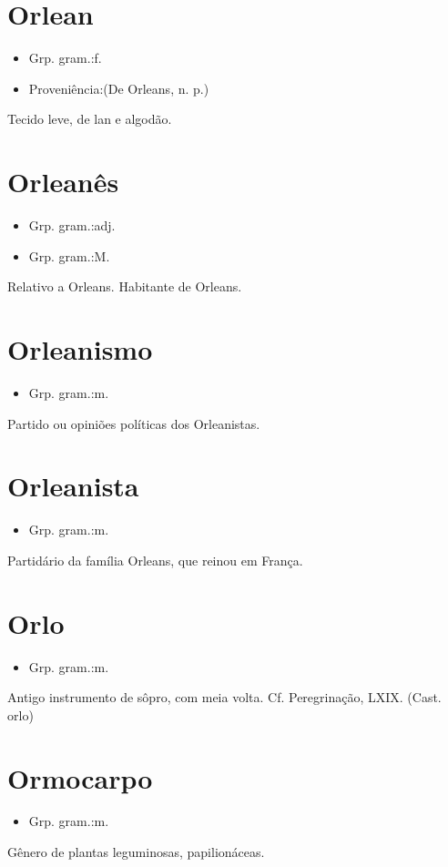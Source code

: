 \section{Orlean}
\begin{itemize}
\item {Grp. gram.:f.}
\end{itemize}
\begin{itemize}
\item {Proveniência:(De \textunderscore Orleans\textunderscore , n. p.)}
\end{itemize}
Tecido leve, de lan e algodão.
\section{Orleanês}
\begin{itemize}
\item {Grp. gram.:adj.}
\end{itemize}
\begin{itemize}
\item {Grp. gram.:M.}
\end{itemize}
Relativo a Orleans.
Habitante de Orleans.
\section{Orleanismo}
\begin{itemize}
\item {Grp. gram.:m.}
\end{itemize}
Partido ou opiniões políticas dos Orleanistas.
\section{Orleanista}
\begin{itemize}
\item {Grp. gram.:m.}
\end{itemize}
Partidário da família Orleans, que reinou em França.
\section{Orlo}
\begin{itemize}
\item {Grp. gram.:m.}
\end{itemize}
Antigo instrumento de sôpro, com meia volta. Cf. \textunderscore Peregrinação\textunderscore , LXIX.
(Cast. \textunderscore orlo\textunderscore )
\section{Ormocarpo}
\begin{itemize}
\item {Grp. gram.:m.}
\end{itemize}
Gênero de plantas leguminosas, papilionáceas.
